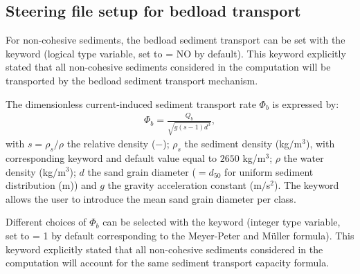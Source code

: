 
\subsection{Steering file setup for bedload transport}
For non-cohesive sediments, the bedload sediment transport can be set with the keyword  (logical type variable, set to {\ttfamily = NO} by default). This keyword explicitly stated that all non-cohesive sediments considered in the computation will be transported by the bedload sediment transport mechanism.

The dimensionless current-induced sediment transport rate $\Phi_b$ is expressed by:
\begin{align}
\Phi_b = \frac{Q_b}{\sqrt{g(s-1)d^3}},
\label{eq:Phis}
\end{align}
with $s=\rho_s/\rho$ the relative density ($-$); $\rho_s$ the sediment density (kg$/$m$^3$), with corresponding keyword  and default value equal to $2650$ kg/m$^3$; $\rho$ the water density (kg$/$m$^3$); $d$ the sand grain diameter ($=d_{50}$ for uniform sediment distribution (m)) and $g$ the gravity acceleration constant (m$/$s$^2$). The keyword  allows the user to introduce the mean sand grain diameter per class.

Different choices of $\Phi_b$ can be selected with the keyword  (integer type variable, set to {\ttfamily = 1} by default corresponding to the Meyer-Peter and M\"uller formula). This keyword explicitly stated that all non-cohesive sediments considered in the computation will account for the same sediment transport capacity formula. %

